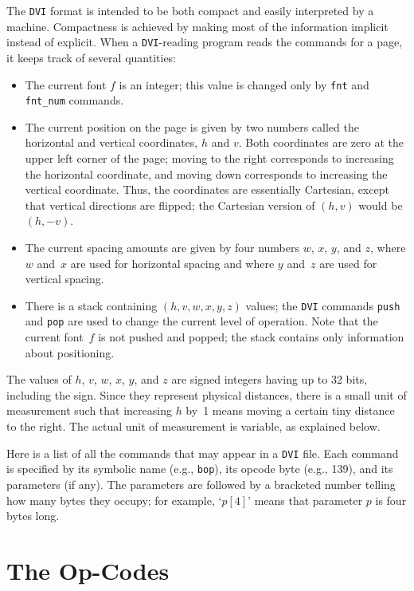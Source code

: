 \documentclass{article}
\begin{document}
The  \texttt{DVI} format is intended to be both 
compact and easily interpreted by a machine. 
Compactness is achieved by making most of the information implicit 
instead of explicit. 
When a \texttt{DVI}-reading program reads the commands for a page, 
it keeps track of several quantities: 
%
\begin{itemize}
\item
The current font $f$ is an integer; 
this value is changed only by \texttt{fnt} and \texttt{fnt\_num} commands. 
\item
The current position on the page 
is given by two numbers called the horizontal and vertical coordinates,
$h$ and $v$. 
Both coordinates are zero at the upper left corner of the page; 
moving to the right corresponds to increasing the horizontal coordinate, and
moving down corresponds to increasing the vertical coordinate. 
Thus, the coordinates are essentially Cartesian, 
except that vertical directions are flipped; 
the Cartesian version of $(h,v)$ would be $(h,-v)$.  
\item
The current spacing amounts 
are given by four numbers $w$, $x$, $y$, and $z$,
where $w$ and~$x$ are used for horizontal spacing and where $y$ and~$z$
are used for vertical spacing. 
\item
There is a stack containing $(h,v,w,x,y,z)$ values; 
the \texttt{DVI} commands \texttt{push} and \texttt{pop} are used 
to change the current level of operation. 
Note that the current font~$f$ is not pushed and popped; 
the stack contains only information about positioning.
\end{itemize}

The values of $h$, $v$, $w$, $x$, $y$, and $z$ are signed integers having up
to 32 bits, including the sign. Since they represent physical distances,
there is a small unit of measurement such that increasing $h$ by~1 means
moving a certain tiny distance to the right. The actual unit of
measurement is variable, as explained below. 

Here is a list of all the commands that may appear in a \texttt{DVI} file. 
Each command is specified by its symbolic name (e.g., \texttt{bop}), 
its opcode byte (e.g., 139), and its parameters (if any). 
The parameters are followed by a bracketed number 
telling how many bytes they occupy; for example,
`$p[4]$' means that parameter $p$ is four bytes long. 

\section{The Op-Codes}\label{sec:opCodes}
\end{document}
